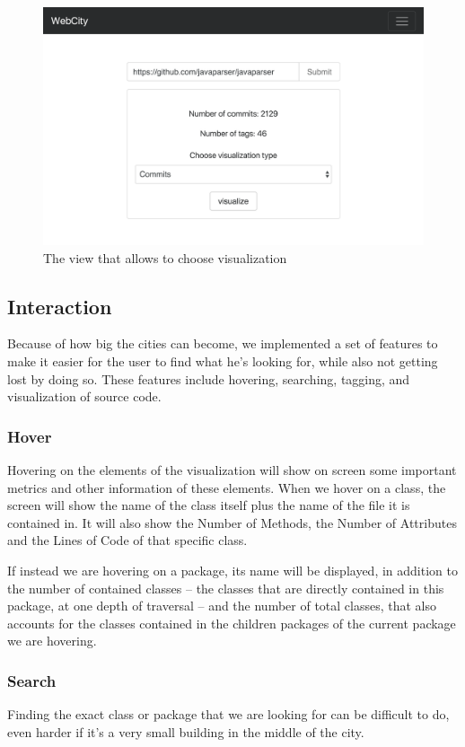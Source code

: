 \documentclass[]{usiinfbachelorproject}
\begin{document}
\begin{figure}[H]
    \centering
  \includegraphics[width=.6\textwidth]{pictures/interface2.png}
  \caption{The view that allows to choose visualization}
  \label{fig:interface2}
\end{figure}

\subsection{Interaction} \label{Interaction}
Because of how big the cities can become, we implemented a set of features to make it easier for the user to find what he's looking for, while also not getting lost by doing so. These features include hovering, searching, tagging, and visualization of source code.

\subsubsection{Hover} \label{Hover}
Hovering on the elements of the visualization will show on screen some important metrics and other information of these elements.
When we hover on a class, the screen will show the name of the class itself plus the name of the file it is contained in. It will also show the Number of Methods,
 the Number of Attributes and the Lines of Code of that specific class.

 If instead we are hovering on a package, its name will be displayed, in addition to the number of contained classes -- the classes that are directly contained in this package, at one depth of traversal --
  and the number of total classes, that also accounts for the classes contained in the children packages of the current package we are hovering.

\subsubsection{Search} \label{Search}
Finding the exact class or package that we are looking for can be difficult to do, even harder if it's a very small building in the middle of the city.
\end{document}
